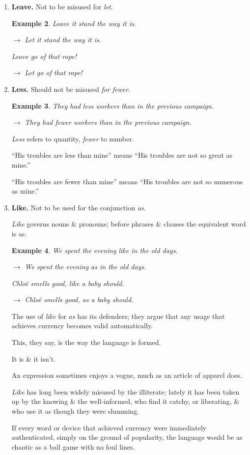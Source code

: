 \documentclass{article}
\newtheorem{example}{Example}
\begin{document}
\begin{enumerate}
\begin{example}
		lay, laid, laid, laying
	\end{example}
	\item {\bf Leave.} Not to be misused for {\it let}.
	\begin{example}
		Leave it stand the way it is.
		
		$\to$ Let it stand the way it is.
		
		Leave go of that rope!
		
		$\to$ Let go of that rope!
	\end{example}
	\item {\bf Less.} Should not be misused {\it for fewer}.
	\begin{example}
		They had less workers than in the previous campaign.
		
		$\to$ They had fewer workers than in the previous campaign.
	\end{example}
	{\it Less} refers to quantity, {\it fewer} to number.
	
	``His troubles are less than mine'' means ``His troubles are not so great as mine.''
	
	``His troubles are fewer than mine'' means ``His troubles are not so numerous as mine.''
	\item {\bf Like.} Not to be used for the conjunction {\it as}.
	
	{\it Like} governs nouns \& pronouns; before phrases \& clauses the equivalent word is as.
	\begin{example}
		We spent the evening like in the old days.
		
		$\to$ We spent the evening as in the old days.
		
		Chlo\"e smells good, like a baby should.
		
		$\to$ Chlo\"e smells good, as a baby should.
	\end{example}
	The use of {\it like} for {\it as} has its defenders; they argue that any usage that achieves currency becomes valid automatically.
	
	This, they say, is the way the language is formed.
	
	It is \& it isn't.
	
	An expression sometimes enjoys a vogue, much as an article of apparel does.
	
	{\it Like} has long been widely misused by the illiterate; lately it has been taken up by the knowing \& the well-informed, who find it catchy, or liberating, \& who use it as though they were slumming.
	
	If every word or device that achieved currency were immediately authenticated, simply on the ground of popularity, the language would be as chaotic as a ball game with no foul lines.
	

\end{enumerate}
\end{document}
